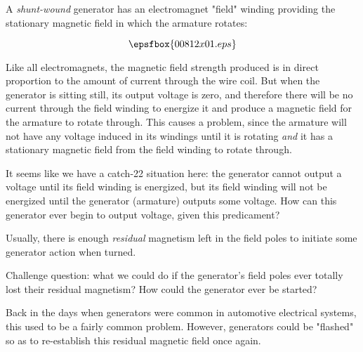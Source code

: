 

A {\it shunt-wound} generator has an electromagnet "field" winding providing the stationary magnetic field in which the armature rotates:

$$\epsfbox{00812x01.eps}$$

Like all electromagnets, the magnetic field strength produced is in direct proportion to the amount of current through the wire coil.  But when the generator is sitting still, its output voltage is zero, and therefore there will be no current through the field winding to energize it and produce a magnetic field for the armature to rotate through.  This causes a problem, since the armature will not have any voltage induced in its windings until it is rotating {\it and} it has a stationary magnetic field from the field winding to rotate through.

It seems like we have a catch-22 situation here: the generator cannot output a voltage until its field winding is energized, but its field winding will not be energized until the generator (armature) outputs some voltage.  How can this generator ever begin to output voltage, given this predicament?







Usually, there is enough {\it residual} magnetism left in the field poles to initiate some generator action when turned.

\vskip 10pt

Challenge question: what we could do if the generator's field poles ever totally lost their residual magnetism?  How could the generator ever be started?







Back in the days when generators were common in automotive electrical systems, this used to be a fairly common problem.  However, generators could be "flashed" so as to re-establish this residual magnetic field once again.




